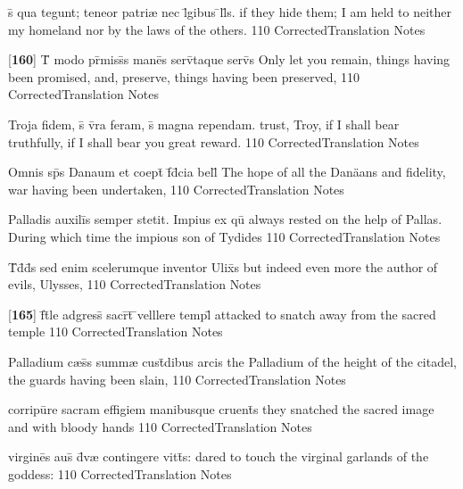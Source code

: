 \latline
  {s\={\macron {\i}} qua tegunt; teneor patri{\ae} nec l\={}gibus \={}ll\={\macron {\i}}s.  }
  { if they hide them; I am held to neither my homeland nor by the laws of the others. }
  {110}
  { CorrectedTranslation }
  { Notes }


\latline
  {[\textbf{160}] T\={} modo pr\={}miss\={\macron {\i}}s mane\={}s serv\={}taque serv\={}s}
  { Only let you remain, things having been promised, and, preserve, things having been preserved,     }
  {110}
  { CorrectedTranslation }
  { Notes }


\latline
  {Troja fidem, s\={\macron {\i}} v\={}ra feram, s\={\macron {\i}} magna rependam.}
  {trust, Troy, if I shall bear truthfully, if I shall bear you great reward. }
  {110}
  { CorrectedTranslation }
  { Notes }


\latline
  {Omnis sp\={}s Danaum et coept\={\macron {\i}} f\={\macron {\i}}d\={}cia bell\={\macron {\i}}}
  { The hope of all the Dan\"aans and fidelity, war having been undertaken,  }
  {110}
  { CorrectedTranslation }
  { Notes }


\latline
  {Palladis auxili\={\macron {\i}}s semper stetit.  Impius ex qu\={}}
  { always rested on the help of Pallas.  During which time the impious son of Tydides  }
  {110}
  { CorrectedTranslation }
  { Notes }


\latline
  {T\={}d\={\macron {\i}}d\={}s sed enim scelerumque inventor Ulix\={}s}
  { but indeed even more the author of evils, Ulysses, }
  {110}
  { CorrectedTranslation }
  { Notes }


\latline
  {[\textbf{165}] f\={}t\={}le adgress\={\macron {\i}} sacr\={}t\={} \={}velllere templ\={}}
  { attacked to snatch away from the sacred temple }
  {110}
  { CorrectedTranslation }
  { Notes }


\latline
  {Palladium c{\ae}s\={\macron {\i}}s summ{\ae} cust\={}dibus arcis}
  { the Palladium of the height of the citadel, the guards having been slain,  }
  {110}
  { CorrectedTranslation }
  { Notes }


\latline
  {corripu\={}re sacram effigiem manibusque cruent\={\macron {\i}}s}
  { they snatched the sacred image and with bloody hands  }
  {110}
  { CorrectedTranslation }
  { Notes }


\latline
  {virgine\={}s aus\={\macron {\i}} d\={\macron {\i}}v{\ae} contingere vitt\={}s:}
  { dared to touch the virginal garlands of the goddess:  }
  {110}
  { CorrectedTranslation }
  { Notes }


